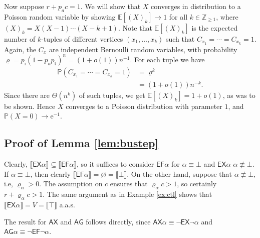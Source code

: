 \documentclass[runngingheads]{llncs}
\newcommand{\sem}[1]{\llbracket #1 \rrbracket}
\newcommand\recht\operatorname
\begin{document}
Now suppose $r+p_ac = 1$. We will show that $X$ converges in distribution to a Poisson random variable by showing $\mathbb{E}[(X)_k] \rightarrow 1$ for all $k \in \mathbb{Z}_{\geq 1}$, where $(X)_k = X(X-1)\cdots(X-k+1)$. Note that $\mathbb{E}[(X)_k]$ is the expected number of $k$-tuples of different vertices $(x_1,\ldots,x_k)$ such that $C_{x_1}=\cdots = C_{x_k} = 1$. Again, the $C_x$ are independent Bernoulli random variables, with probability $\varrho = p_{\recht{i}}(1-p_ap_{\recht{t}})^n = (1+o(1))n^{-1}$. For each tuple we have
\begin{align*}
\mathbb{P}(C_{x_1} = \cdots = C_{x_k} = 1) &= \varrho^k \\
&= (1+o(1))n^{-k}.
\end{align*}
Since there are $\Theta(n^k)$ of such tuples, we get $\mathbb{E}[(X)_k] = 1+o(1)$, as was to be shown. Hence $X$ converges to a Poisson distribution with parameter $1$, and $\mathbb{P}(X=0) \rightarrow \textrm{e}^{-1}$.

\subsection{Proof of Lemma \ref{lem:bustep}}

Clearly, $\sem{\mathsf{EX}\alpha} \subseteq \sem{\mathsf{EF}\alpha}$, so it suffices to consider $\mathsf{EF}\alpha$ for $\alpha \equiv \bot$ and $\mathsf{EX}\alpha$ $\alpha \not \equiv \bot$.
If $\alpha \equiv \bot$, then clearly $\sem{\mathsf{EF}\alpha} = \varnothing = \sem{\bot}$. On the other hand, suppose that $\alpha \not \equiv \bot$, i.e, $\varrho_{\alpha} > 0$. The assumption on $c$ ensures that $\varrho_{\alpha}c > 1$, so certainly $r+\varrho_{\alpha}c > 1$. The same argument as in Example \ref{ex:ctl} shows that $\sem{\mathsf{EX}\alpha} = V = \sem{\top}$ a.a.s.

The result for $\mathsf{AX}$ and $\mathsf{AG}$ follows directly, since $\mathsf{AX}\alpha \equiv \neg \mathsf{EX}\neg \alpha$ and $\mathsf{AG}\alpha \equiv \neg \mathsf{EF}\neg \alpha$.
\end{document}
